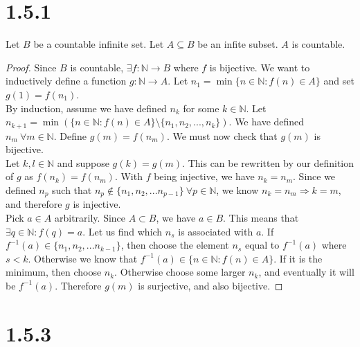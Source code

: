 \documentclass{article}
\begin{document}
\section*{1.5.1}

Let $B$ be a countable infinite set. Let $A \subseteq B$ be an infite subset. $A$ is countable.

\begin{proof}
Since $B$ is countable, $\exists f : \mathbb{N} \rightarrow B$ where $f$ is bijective. We want to inductively define a function $g:\mathbb{N} \rightarrow A$. Let $n_1 = \min \{n \in \mathbb{N} : f(n) \in A\}$ and set $g(1) = f(n_1)$. \\ 

By induction, assume we have defined $n_k$ for some $k \in \mathbb{N}$. Let $n_{k+1} = \min ( \{ n \in \mathbb{N} : f(n) \in A \} \setminus \{ n_1, n_2 , ... , n_k \} )$. We have defined $n_m \ \forall m \in \mathbb{N}$. Define $g(m) = f(n_m)$. We must now check that $g(m)$ is bijective. \\

Let $k, l \in \mathbb{N}$ and suppose $g(k) = g(m)$. This can be rewritten by our definition of $g$ as $f(n_k) = f(n_m)$. With $f$ being injective, we have $n_k = n_m$. Since we defined $n_p$ such that $n_p \notin \{n_1, n_2, ... n_{p-1} \} \ \forall p \in \mathbb{N}$, we know $n_k = n_m \Longrightarrow k = m$, and therefore $g$ is injective. \\

Pick $a \in A$ arbitrarily. Since $A \subset B$, we have $a \in B$. This means that $\exists q \in \mathbb{N} : f(q) = a$. Let us find which $n_s$ is associated with $a$. If $f^{-1}(a) \in \{n_1, n_2, ... n_{k-1}\}$, then choose the element $n_s$ equal to $f^{-1}(a)$ where $s < k$. Otherwise we know that $f^{-1}(a) \in \{ n \in \mathbb{N} : f(n) \in A \}$. If it is the minimum, then choose $n_k$. Otherwise choose some larger $n_k$, and eventually it will be $f^{-1}(a)$. Therefore $g(m)$ is surjective, and also bijective.

\end{proof}

\section*{1.5.3}
\end{document}
